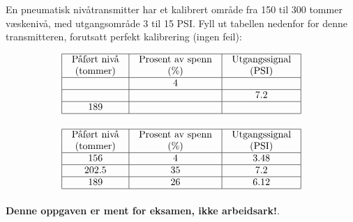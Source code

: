 

En pneumatisk nivåtransmitter har et kalibrert område fra 150 til 300 tommer væskenivå, med utgangsområde 3 til 15 PSI. Fyll ut tabellen nedenfor for denne transmitteren, forutsatt perfekt kalibrering (ingen feil):


$$\vbox{\offinterlineskip
\halign{\strut
\vrule \quad\hfil # \ \hfil & 
\vrule \quad\hfil # \ \hfil & 
\vrule \quad\hfil # \ \hfil \vrule \cr
\noalign{\hrule}
%
Påført nivå & Prosent av spenn & Utgangssignal \cr
%
(tommer) & (\%) & (PSI) \cr
%
\noalign{\hrule}
%
 & 4 &  \cr
%
\noalign{\hrule}
%
 &  & 7.2 \cr
%
\noalign{\hrule}
%
189 &  &  \cr
%
\noalign{\hrule}
} %
}$$ %









$$\vbox{\offinterlineskip
\halign{\strut
\vrule \quad\hfil # \ \hfil & 
\vrule \quad\hfil # \ \hfil & 
\vrule \quad\hfil # \ \hfil \vrule \cr
\noalign{\hrule}
%
Påført nivå & Prosent av spenn & Utgangssignal \cr
%
(tommer) & (\%) & (PSI) \cr
%
\noalign{\hrule}
%
156 & 4 & 3.48 \cr
%
\noalign{\hrule}
%
202.5 & 35 & 7.2 \cr
%
\noalign{\hrule}
%
189 & 26 & 6.12 \cr
%
\noalign{\hrule}
} %
}$$ %







{\bf Denne oppgaven er ment for eksamen, ikke arbeidsark!}.


